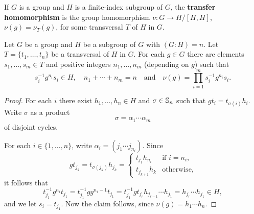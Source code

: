 If $G$ is a group and $H$ is a finite-index subgroup of $G$, the 
\textbf{transfer homomorphism} is the group homomorphism $\nu\colon G\to H/[H,H]$,
$\nu(g)=\nu_T(g)$, for some transversal $T$ of $H$ in $G$.
	
%
%
%


\begin{lemma}
	\label{lem:evaluation}
	Let $G$ be a group and $H$ be a subgroup of $G$ with $(G:H)=n$. Let 
	$T=\{t_1,\dots,t_n\}$ be a transversal of $H$ in $G$.  For each $g\in G$
	there are elements $s_{1},\dots,s_{m}\in T$ and positive integers $n_1,\dots,n_m$
	(depending on $g$) such that 
	\[
	s_i^{-1}g^{n_i}s_i\in H,
	\quad
	n_1+\cdots+n_m=n\quad\text{and}\quad   
	\nu(g)=\prod_{i=1}^m s_i^{-1}g^{n_i}s_i.
	\]
\end{lemma}


\begin{proof}
	For each $i$ there exist $h_1,\dots,h_n\in H$ and $\sigma\in\mathbb{S}_n$ such that 
	$gt_i=t_{\sigma(i)}h_i$. Write $\sigma$ as a product 
	\[
		\sigma=\alpha_1\cdots\alpha_m
	\]
	of disjoint cycles. 

	For each $i\in\{1,\dots,n\}$, write  
	$\alpha_i=(j_{1}\cdots j_{n_i})$. Since  
	\[
		g t_{j_k}=t_{\sigma(j_k)}h_{j_k}=\begin{cases}
			t_{j_1}h_{n_i} & \text{if $i=n_i$},\\
			t_{j_{k+1}}h_{k} & \text{otherwise},
		\end{cases}
	\]
	it follows that 
	\[
	t_{j_1}^{-1}g^{n_i}t_{j_1}
	=t_{j_1}^{-1}gg^{n_i-1}t_{j_1}
	=t_{j_1}^{-1}gt_{j_r}h_{j_{r-1}}\cdots h_{j_1}
	=h_{j_r}\cdots h_{j_1}\in H,
	\]
	and we let $s_i=t_{j_1}$. Now the claim follows, since $\nu(g)=h_1\cdots h_{n}$.
\end{proof}

